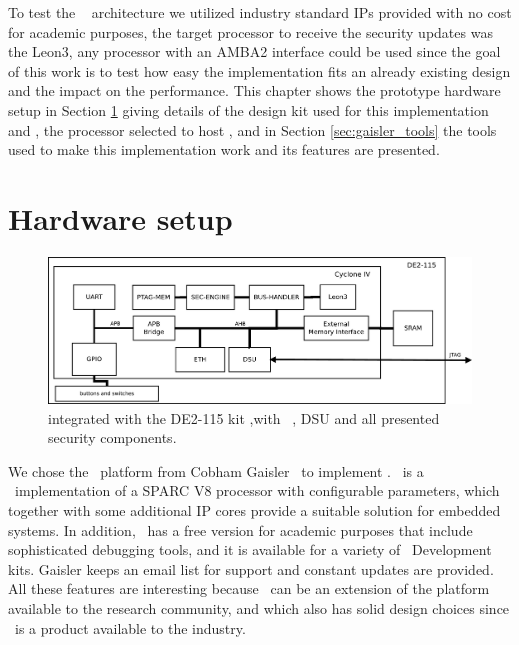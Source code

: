To test the \cshia~ architecture  we utilized industry standard IPs provided with no cost for academic purposes, the target processor to receive the security updates was the Leon3, any processor with an AMBA2 interface  could be used since the goal of this work is to test how easy the implementation fits an already existing design and  the impact on the performance. This chapter shows the prototype hardware setup in Section \ref{sec:hardware_setup} giving details of the design kit used for this implementation and \leon, the processor selected to host \cshia,  and in Section \ref{sec:gaisler_tools} the tools used to make this implementation work and its features are presented. 

 

\section{Hardware setup}
\label{sec:hardware_setup}
 \begin{figure}[!ht]
    \centering
    \includegraphics[width=1\textwidth]{figures/pdf/leon_amba_new.pdf}
    \caption{\cshia integrated with the DE2-115 kit ,with \leon~, DSU and all presented security components. }
    \label{fig:leoninamba}
\end{figure}

We chose the \leon~platform from Cobham Gaisler~\cite{Leon} to implement \cshia. \leon~is a \vhdl~implementation of a SPARC V8 processor with configurable parameters, which together with some additional IP cores provide a suitable solution for embedded systems. In addition, \leon~has a free version for academic purposes that include sophisticated debugging tools, and it is available for a variety of \fpga~Development kits. Gaisler keeps an email list for support and constant updates are provided. All these features are interesting because \cshia~can be an extension of the platform available to the research community, and which also has solid design choices since \leon~is a product available to the industry.


